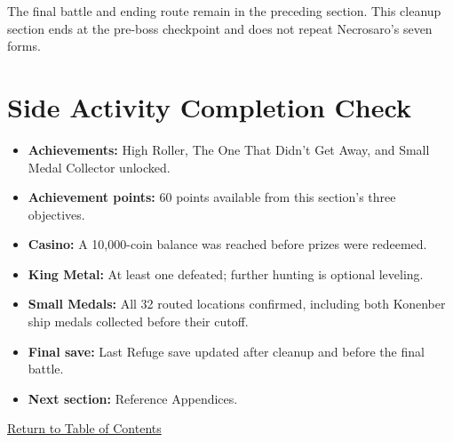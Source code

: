\documentclass[
  american,
  10pt,
  letterpaper,
  oneside,
  open=any]{scrreprt}
\providecommand{\tightlist}{%
  \setlength{\itemsep}{0pt}\setlength{\parskip}{0pt}}
\begin{document}
The final battle and ending route remain in the preceding section. This
cleanup section ends at the pre-boss checkpoint and does not repeat
Necrosaro's seven forms.

\section{Side Activity Completion
Check}\label{side-activity-completion-check}

\begin{itemize}
\tightlist
\item
  \textbf{Achievements:} High Roller, The One That Didn't Get Away, and
  Small Medal Collector unlocked.
\item
  \textbf{Achievement points:} 60 points available from this section's
  three objectives.
\item
  \textbf{Casino:} A 10,000-coin balance was reached before prizes were
  redeemed.
\item
  \textbf{King Metal:} At least one defeated; further hunting is
  optional leveling.
\item
  \textbf{Small Medals:} All 32 routed locations confirmed, including
  both Konenber ship medals collected before their cutoff.
\item
  \textbf{Final save:} Last Refuge save updated after cleanup and before
  the final battle.
\item
  \textbf{Next section:} Reference Appendices.
\end{itemize}

\hyperref[table-of-contents]{Return to Table of Contents}
\end{document}
